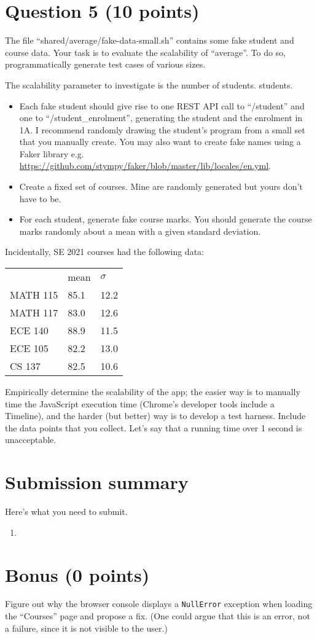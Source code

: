 \documentclass[10pt]{article}
\begin{document}
\section*{Question 5 (10 points)}
The file ``shared/average/fake-data-small.sh'' 
contains some fake student and course
data.  Your task is to evaluate the scalability of ``average''. To do
so, programmatically generate test cases of various sizes. 

The scalability parameter to investigate is the number of students.
students.  
\begin{itemize}
\item Each fake student should give rise to one REST API call to
``/student'' and one to ``/student\_enrolment'', generating the
student and the enrolment in 1A. I recommend randomly drawing the
student's program from a small set that you manually create. 
You may also want to create fake names using a Faker library e.g.
\url{https://github.com/stympy/faker/blob/master/lib/locales/en.yml}.
\item Create a fixed set of courses. Mine are randomly generated but
yours don't have to be. 
\item For each student, generate fake course marks. 
You should generate the course marks randomly about a mean with a given
standard deviation.
\end{itemize}

Incidentally, SE 2021 courses had the following data: 
\begin{tabular}{lll}
& mean & $\sigma$\\
MATH 115 & 85.1 & 12.2 \\
MATH 117 & 83.0 & 12.6 \\
ECE 140 & 88.9 & 11.5 \\
ECE 105 & 82.2 & 13.0 \\
CS 137 & 82.5 & 10.6
\end{tabular}

Empirically determine the scalability of the app; the easier way is to
manually time the JavaScript execution time (Chrome's developer tools
include a Timeline), and the harder (but better) way is to develop a
test harness.  Include the data points that you collect. Let's say
that a running time over 1 second is unacceptable.

\section*{Submission summary}
Here's what you need to submit.
\begin{enumerate}
\item 
\end{enumerate}


\section*{Bonus (0 points)}
Figure out why the browser console displays a {\tt NullError} exception
when loading the ``Courses'' page and propose a fix.
(One could argue that this is an error, not a failure, since it is not visible
to the user.)
\end{document}
